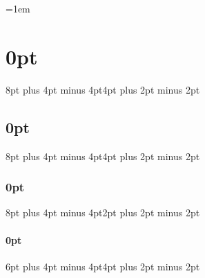 \usepackage{enumitem}

\usepackage{mathptmx}

\usepackage{code}

\usepackage[protrusion=true,expansion=true]{microtype}

\usepackage{doi}
\usepackage{xspace}

\usepackage[top=1in,bottom=1in,left=1in,right=1in]{geometry}

\usepackage{parskip}
\parskip=0mm   %
\parindent=1em

\usepackage{subcaption}

\usepackage{titlesec}
\titlespacing\section{0pt}{8pt plus 4pt minus 4pt}{4pt plus 2pt minus 2pt}
\titlespacing\subsection{0pt}{8pt plus 4pt minus 4pt}{4pt plus 2pt minus 2pt}
\titlespacing\subsubsection{0pt}{8pt plus 4pt minus 4pt}{2pt plus 2pt minus 2pt}
\titlespacing\paragraph{0pt}{6pt plus 4pt minus 4pt}{4pt plus 2pt minus 2pt}

%

\usepackage{amsmath}


